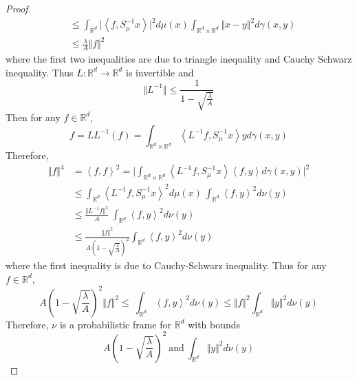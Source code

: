 \documentclass[10pt,a4paper]{amsart}
\begin{document}
\begin{proof}
\begin{equation*}
\begin{split}
    &\leq \int_{\mathbb{R}^d} \vert \left\langle f, S_\mu^{-1} x \right\rangle \vert^2  d \mu(x)  \int_{\mathbb{R}^d  \times \mathbb{R}^d} \Vert x -y\Vert^2 d \gamma(x, y)    \\
    &\leq  \frac{\lambda}{A}  \Vert f  \Vert^2  
\end{split}
\end{equation*}
where the first two inequalities are due to triangle inequality and Cauchy Schwarz inequality. Thus $L: \mathbb{R}^d \rightarrow \mathbb{R}^d$ is invertible and 
\begin{equation*}
    \Vert L^{-1} \Vert \leq \frac{1}{1-\sqrt{\frac{\lambda}{A}}} 
\end{equation*}
Then for any $f \in \mathbb{R}^d$, 
\begin{equation*}
    f = LL^{-1}(f) =  \int_{\mathbb{R}^d \times \mathbb{R}^d} \left\langle L^{-1}f,  S_\mu^{-1} x \right\rangle  y  d\gamma(x,y) 
\end{equation*}
Therefore, 
\begin{equation*}
\begin{split}
   \Vert  f \Vert^4 &=  \left\langle f, f \right\rangle^2 = \Big \vert  \int_{\mathbb{R}^d \times \mathbb{R}^d} \left\langle L^{-1}f,  S_\mu^{-1} x \right\rangle   \left\langle  f, y \right\rangle   d\gamma(x,y) \Big \vert^2\\
   & \leq \int_{\mathbb{R}^d} \left\langle L^{-1}f,  S_\mu^{-1} x \right\rangle^2 d\mu(x)  \ \int_{\mathbb{R}^d} \left\langle f, y \right\rangle^2 d\nu(y)\\
 &\leq \frac{ \Vert L^{-1} f \Vert^2 }{A}    \ \int_{\mathbb{R}^d} \left\langle f, y \right\rangle^2 d\nu(y)\\
   &\leq \frac{\Vert f \Vert^2 }{A (1-\sqrt{\frac{\lambda}{A}})^2}   \int_{\mathbb{R}^d} \left\langle f, y \right\rangle^2 d\nu(y)
\end{split}
\end{equation*}
where the first inequality is due to Cauchy-Schwarz inequality. Thus for any $f \in \mathbb{R}^d$, 
\begin{equation*}
 A (1-\sqrt{\frac{\lambda}{A}})^2    \Vert  f \Vert^2  \leq  \ \int_{\mathbb{R}^d} \left\langle f, y \right\rangle^2 d\nu(y) \leq \Vert  f \Vert^2 \int_{\mathbb{R}^d} \Vert y \Vert^2 d \nu(y)
\end{equation*} 
Therefore, $\nu$ is a probabilistic frame for $\mathbb{R}^d$ with bounds
 \begin{equation*}
    A (1-\sqrt{\frac{\lambda}{A}})^2   \ \text{and} \ \int_{\mathbb{R}^d} \Vert y \Vert^2 d \nu(y)
 \end{equation*}
\end{proof}
\end{document}

